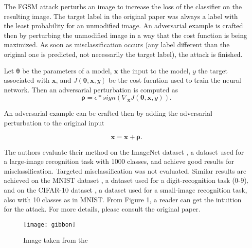 The FGSM attack perturbs an image to increase the loss of the classifier on the resulting image. The target label in the original paper \cite{fgsm-original} was always a label with the least probability for an unmodified image. An adversarial example is crafted then by perturbing the unmodified image in a way that the cost function is being maximized. As soon as misclassification occurs (any label different than the original one is predicted, not necessarily the target label), the attack is finished.

Let $\pmb \theta$ be the parameters of a model, $\pmb x$ the input to the model, $y$ the target associated with $\pmb x$, and $J (\pmb \theta, \pmb x, y)$ be the cost fucntion used to train the neural network. Then an adversarial perturbation is computed as 
\[ 
\pmb \rho = \epsilon * sign (\nabla_{\pmb x} J(\pmb \theta, \pmb x, y)).
\]

An adversarial example can be crafted then by adding the adversarial perturbation to the original input

\[\pmb x = \pmb x + \pmb \rho .\]
 
The authors evaluate their method on the ImageNet dataset \cite{datasetImageNet}, a dataset used for a large-image recognition task with 1000 classes, and achieve good results for misclassification. Targeted misclassification was not evaluated. Similar results are achieved on the MNIST dataset \cite{datasetMNIST}, a dataset used for a digit-recognition task (0-9), and on the CIFAR-10 dataset \cite{datasetCIFAR10}, a dataset used for a small-image recognition task, also with 10 classes as in MNIST. From Figure \ref{fig:gibbon}, a reader can get the intuition for the attack. For more details, please consult the original paper.

\begin{figure}[h]
\texttt{[image: gibbon]}
\caption{Image taken from the \cite{fgsm-original}}
\label{fig:gibbon}
\end{figure}

